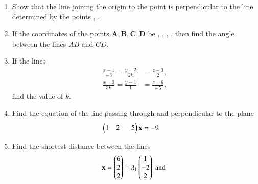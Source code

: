 \begin{enumerate}[label=\arabic*.,ref=\thesubsection.\theenumi]
\begin{table}[!h]
\centering

\caption{}
\label{table:3d}
\end{table}
%
\item Show that the line joining the origin to the point  is perpendicular to the line determined by the points , .
\item If the coordinates of the points $\bm{A}, \bm{B}, \bm{C}, \bm{D}$ be , , , , then find the angle between the lines $AB$ and $CD$.  
%
\item If the lines 
\begin{align}
\frac{x-1}{-3} = \frac{y-2}{2k} &= \frac{z-3}{2}, 
\\
\frac{x-3}{3k} = \frac{y-1}{1} &= \frac{z-6}{-5} ,
\end{align}
find the value of $k$.
\item Find the  equation of the line passing through  and perpendicular to the plane %
\begin{align}
\begin{pmatrix}1 & 2 & -5\end{pmatrix}\mathbf{x}&=-9
\end{align}
\item Find the shortest distance between the lines 
%
\begin{align}
\vec{x} = \myvec{6 \\ 2 \\ 2} + \lambda_1 \myvec{1 \\ -2 \\ 2}  \text{ and }

\end{align}
\end{enumerate}
